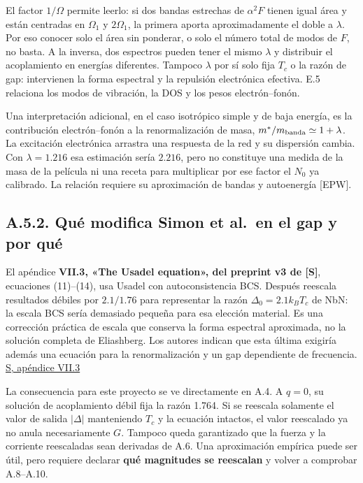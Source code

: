 \documentclass[
  spanish,
  10pt,
  a4paper,
]{article}
\begin{document}
El factor \(1/\Omega\) permite leerlo: si dos bandas estrechas de
\(\alpha^2F\) tienen igual área y están centradas en \(\Omega_1\) y
\(2\Omega_1\), la primera aporta aproximadamente el doble a \(\lambda\).
Por eso conocer solo el área sin ponderar, o solo el número total de
modos de \(F\), no basta. A la inversa, dos espectros pueden tener el
mismo \(\lambda\) y distribuir el acoplamiento en energías diferentes.
Tampoco \(\lambda\) por sí solo fija \(T_c\) o la razón de gap:
intervienen la forma espectral y la repulsión electrónica efectiva. E.5
relaciona los modos de vibración, la DOS y los pesos electrón--fonón.

Una interpretación adicional, en el caso isotrópico simple y de baja
energía, es la contribución electrón--fonón a la renormalización de
masa, \(m^*/m_{\rm banda}\simeq1+\lambda\). La excitación electrónica
arrastra una respuesta de la red y su dispersión cambia. Con
\(\lambda=1.216\) esa estimación sería \(2.216\), pero no constituye una
medida de la masa de la película ni una receta para multiplicar por ese
factor el \(N_0\) ya calibrado. La relación requiere su aproximación de
bandas y autoenergía {[}EPW{]}.

\subsection{A.5.2. Qué modifica Simon et al.~en el gap y por
qué}\label{a.5.2.-quuxe9-modifica-simon-et-al.-en-el-gap-y-por-quuxe9}

El apéndice \textbf{VII.3, «The Usadel equation», del preprint v3 de
{[}S{]}}, ecuaciones (11)--(14), usa Usadel con autoconsistencia BCS.
Después reescala resultados débiles por \(2.1/1.76\) para representar la
razón \(\Delta_0=2.1k_BT_c\) de NbN: la escala BCS sería demasiado
pequeña para esa elección material. Es una corrección práctica de escala
que conserva la forma espectral aproximada, no la solución completa de
Eliashberg. Los autores indican que esta última exigiría además una
ecuación para la renormalización y un gap dependiente de frecuencia.
\href{https://arxiv.org/html/2501.13791v3\#S7.SS3}{S, apéndice VII.3}

La consecuencia para este proyecto se ve directamente en A.4. A \(q=0\),
su solución de acoplamiento débil fija la razón 1.764. Si se reescala
solamente el valor de salida \(|\Delta|\) manteniendo \(T_c\) y la
ecuación intactos, el valor reescalado ya no anula necesariamente \(G\).
Tampoco queda garantizado que la fuerza y la corriente reescaladas sean
derivadas de A.6. Una aproximación empírica puede ser útil, pero
requiere declarar \textbf{qué magnitudes se reescalan} y volver a
comprobar A.8--A.10.
\end{document}
